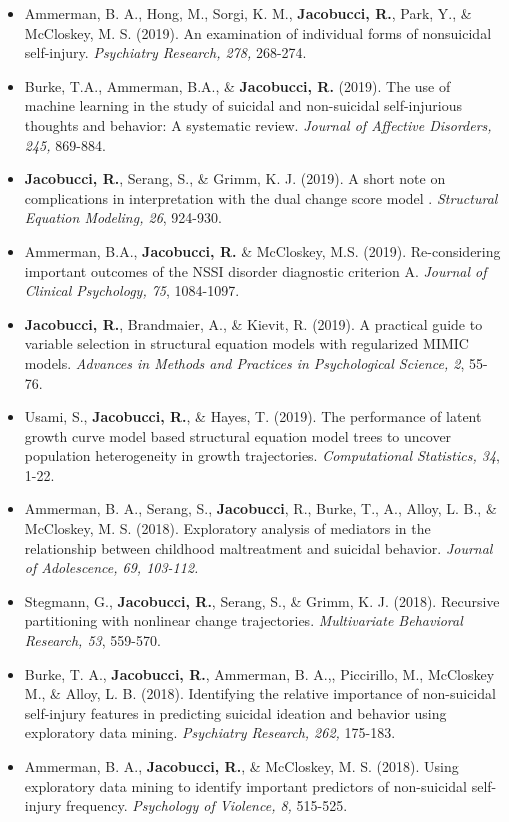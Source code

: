 \documentclass[letterpaper,10pt]{article}
\begin{document}
\begin{itemize}
%
\item[] Ammerman, B. A., Hong, M., Sorgi, K. M., \textbf{Jacobucci, R.}, Park, Y., \& McCloskey, M. S. (2019). An examination of individual forms of nonsuicidal self-injury. \emph{Psychiatry Research, 278,} 268-274.
%
\item[] Burke, T.A., Ammerman, B.A., \& \textbf{Jacobucci, R.} (2019). The use of machine learning in the study of suicidal and non-suicidal self-injurious thoughts and behavior: A systematic review. \emph{Journal of Affective Disorders, 245,} 869-884.
%
\item[] \textbf{Jacobucci, R.}, Serang, S., \& Grimm, K. J. (2019). A short note on complications in interpretation with the dual change score model . \emph{Structural Equation Modeling, 26}, 924-930.
%
\item[] Ammerman, B.A., \textbf{Jacobucci, R.} \& McCloskey, M.S. (2019). Re-considering important outcomes of the NSSI disorder diagnostic criterion A. \emph{Journal of Clinical Psychology, 75}, 1084-1097.
% 
\item[] \textbf{Jacobucci, R.}, Brandmaier, A., \& Kievit, R. (2019). A practical guide to variable selection in structural equation models with regularized MIMIC models. \emph{Advances in Methods and Practices in Psychological Science, 2}, 55-76.  
%
\item[] Usami, S., \textbf{Jacobucci, R.}, \& Hayes, T. (2019). The performance of latent growth curve model based structural equation model trees to uncover population heterogeneity in growth trajectories. \emph{Computational Statistics, 34}, 1-22.
%
\item[]Ammerman, B. A., Serang, S., \textbf{Jacobucci}, R., Burke, T., A., Alloy, L. B., \& McCloskey, M. S. (2018). Exploratory analysis of mediators in the relationship between childhood maltreatment and suicidal behavior. \emph{Journal of Adolescence, 69, 103-112.}
%
\item[]Stegmann, G., \textbf{Jacobucci, R.}, Serang, S., \& Grimm, K. J. (2018). Recursive partitioning with nonlinear change trajectories. \emph{Multivariate Behavioral Research, 53}, 559-570.
%
\item[]Burke, T. A., \textbf{Jacobucci, R.}, Ammerman, B. A.,, Piccirillo, M., McCloskey M., \& Alloy, L. B. (2018). Identifying the relative importance of non-suicidal self-injury features in predicting suicidal ideation and behavior using exploratory data mining. \emph{Psychiatry Research, 262,} 175-183.
%
\item[]Ammerman, B. A., \textbf{Jacobucci, R.}, \& McCloskey, M. S. (2018). Using exploratory data mining to identify important predictors of non-suicidal self-injury frequency. \emph{Psychology of Violence, 8,} 515-525.

\end{itemize}
\end{document}
